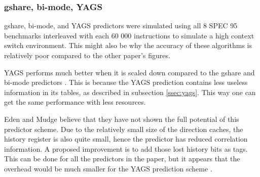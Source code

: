 \subsubsection*{gshare, bi-mode, YAGS}
gshare, bi-mode, and YAGS predictors were simulated using all 8 SPEC 95 benchmarks interleaved with each 60 000 instructions to simulate a high context switch environment.
This might also be why the accuracy of these algorithms is relatively poor compared to the other paper's figures.

YAGS performs much better when it is scaled down compared to the gshare and bi-mode predictors \cite{yags}.
This is because the YAGS prediction contains less useless information in its tables, as described in subsection \ref{ssec:yags}.
This way one can get the same performance with less resources.

Eden and Mudge believe that they have not shown the full potential of this predictor scheme.
Due to the relatively small size of the direction caches, the history register is also quite small, hence the predictor has reduced correlation information.
A proposed improvement is to add those lost history bits as tags.
This can be done for all the predictors in the paper, but it appears that the overhead would be much smaller for the YAGS prediction scheme \cite{yags}. 
